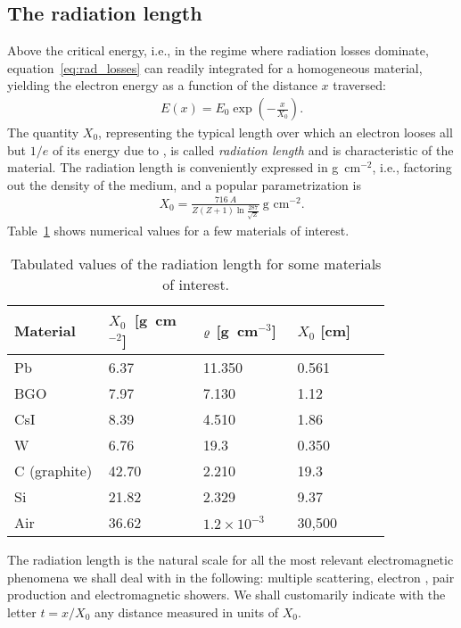 \subsection{The radiation length}%
\label{sec:radiation_length}

Above the critical energy, i.e., in the regime where radiation losses dominate,
equation~\eqref{eq:rad_losses} can readily integrated for a homogeneous material,
yielding the electron energy as a function of the distance $x$ traversed:
\begin{align}
  E(x) = E_0 \exp\left(-\frac{x}{X_0}\right).
\end{align}
The quantity $X_0$, representing the typical length over which an electron looses
all but $1/e$ of its energy due to \bremss, is called \emph{radiation length} and
is characteristic of the material. The radiation length is conveniently expressed
in g~cm$^{-2}$, i.e., factoring out the density of the medium, and a popular
parametrization is
\begin{align}
  X_0 = \frac{716~A}{Z(Z + 1) \ln\frac{287}{\sqrt{Z}}}~\text{g~cm}^{-2}.
\end{align}
Table~\ref{tab:exp_radlen} shows numerical values for a few materials of interest.

\begin{table}[htb!]
  \begin{tabular}{p{0.21\linewidth}p{0.21\linewidth}p{0.21\linewidth}%
      p{0.21\linewidth}}
    \hline
    Material & $X_0$~[g~cm$^{-2}$] & $\varrho$ [g~cm$^{-3}$] & $X_0$ [cm]\\
    \hline
    \hline
    Pb & 6.37 & 11.350 & 0.561\\
    BGO & 7.97 & 7.130 & 1.12\\
    CsI & 8.39 & 4.510 & 1.86\\
    W & 6.76 & 19.3 & 0.350\\
    C (graphite) & 42.70 & 2.210 & 19.3\\
    Si & 21.82 & 2.329 & 9.37\\
    Air & 36.62 & $1.2 \times 10^{-3}$ & 30,500\\
    \hline
  \end{tabular}
  \caption{Tabulated values of the radiation length for some materials of
    interest.}
  \label{tab:exp_radlen}
\end{table}

The radiation length is the natural scale for all the most relevant
electromagnetic phenomena we shall deal with in the following: multiple
scattering, electron \bremss, pair production and electromagnetic
showers. We shall customarily indicate with the letter $t = x/X_0$ any
distance measured in units of $X_0$.


